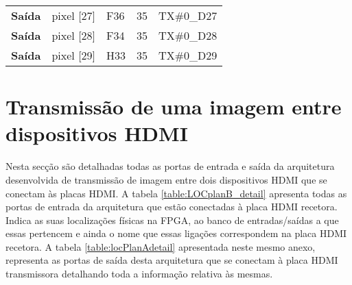 \begin{longtable}{@{}rllll@{}}
			\multicolumn{1}{r|}{\textbf{Saída}} & pixel {[}27{]}                     & F36                                      & 35                                         & TX\#0\_D27                                      \\
			\multicolumn{1}{r|}{\textbf{Saída}} & pixel {[}28{]}                     & F34                                      & 35                                         & TX\#0\_D28                                      \\
			\multicolumn{1}{r|}{\textbf{Saída}} & pixel {[}29{]}                     & H33                                      & 35                                         & TX\#0\_D29                                      \\  
			\hline 

\end{longtable}

\section{Transmissão de uma imagem entre dispositivos HDMI} \label{ap3:imagem_RX_TX}
%
Nesta secção são detalhadas todas as portas de entrada e saída da arquitetura desenvolvida de transmissão de imagem entre dois dispositivos HDMI que se conectam às placas HDMI. 
%
A tabela \ref{table:LOCplanB_detail} apresenta todas as portas de entrada da arquitetura que estão conectadas à placa HDMI recetora. Indica as suas localizações físicas na FPGA, ao banco de entradas/saídas a que essas pertencem e ainda o nome que essas ligações correspondem na placa HDMI recetora. A tabela \ref{table:locPlanAdetail} apresentada neste mesmo anexo, representa as portas de saída desta arquitetura que se conectam à placa HDMI transmissora detalhando toda a informação relativa às mesmas.

